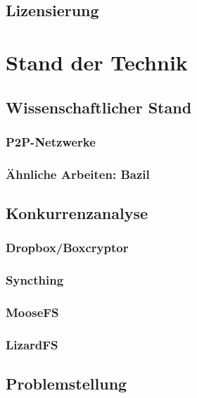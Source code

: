\documentclass[11pt,ngerman,toc=listof,index=totoc]{scrreprt}
\begin{document}
\section{Lizensierung}\label{lizensierung}

\chapter{Stand der Technik}\label{stand-der-technik}

\section{Wissenschaftlicher Stand}\label{wissenschaftlicher-stand}

\subsection{P2P-Netzwerke}\label{p2p-netzwerke}

\subsection{Ähnliche Arbeiten: Bazil}\label{uxe4hnliche-arbeiten-bazil}

\section{Konkurrenzanalyse}\label{konkurrenzanalyse}

\subsection{Dropbox/Boxcryptor}\label{dropboxboxcryptor}

\subsection{Syncthing}\label{syncthing}

\subsection{MooseFS}\label{moosefs}

\subsection{LizardFS}\label{lizardfs}

\section{Problemstellung}\label{problemstellung}
\end{document}
